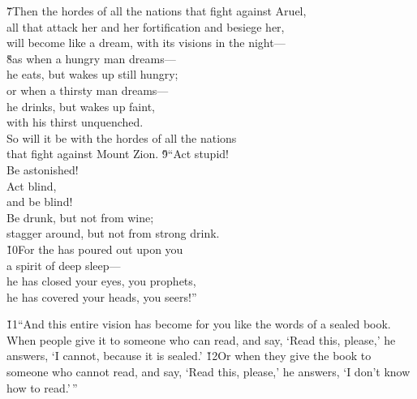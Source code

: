 \begin{poetry}
\poeml \v{7}Then the hordes of all the nations that fight against Aruel, \\
\poemll    all that attack her and her fortification and besiege her, \\
\poemlll       will become like a dream, with its visions in the night--- \\
\poeml \v{8}as when a hungry man dreams--- \\
\poemll    he eats, but wakes up still hungry; \\
\poeml or when a thirsty man dreams--- \\
\poemll    he drinks, but wakes up faint, \\
\poemlll       with his thirst unquenched. \\
\poeml So will it be with the hordes of all the nations \\
\poemll    that fight against Mount Zion.
\poeml \v{9}``Act stupid! \\
\poemll    Be astonished! \\
\poeml Act blind, \\
\poemll    and be blind! \\
\poeml Be drunk, but not from wine; \\
\poemll    stagger around, but not from strong drink. \\
\poeml \v{10}For the  has poured out upon you \\
\poemll    a spirit of deep sleep--- \\
\poeml he has closed your eyes, you prophets, \\
\poemll    he has covered your heads, you seers!''
\end{poetry}

\v{11}``And this entire vision has become for you like the words of a sealed book. When people give it to someone who can read, and say, `Read this, please,' he answers, `I cannot, because it is sealed.' \v{12}Or when they give the book to someone who cannot read, and say, `Read this, please,' he answers, `I don't know how to read.'\,''

